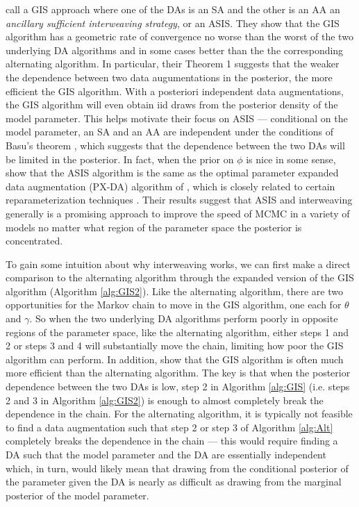 \documentclass{article}
\begin{document}
 call a GIS approach where one of the DAs is an SA and the other is an AA an {\it ancillary sufficient interweaving strategy}, or an ASIS. They show that the GIS algorithm has a geometric rate of convergence no worse than the worst of the two underlying DA algorithms and in some cases better than the the corresponding alternating algorithm. In particular, their Theorem 1 suggests that the weaker the dependence between two data augumentations in the posterior, the more efficient the GIS algorithm. With a posteriori independent data augmentations, the GIS algorithm will even obtain iid draws from the posterior density of the model parameter. This helps motivate their focus on ASIS --- conditional on the model parameter, an SA and an AA are independent under the conditions of Basu's theorem \cite{basu1955statistics}, which suggests that the dependence between the two DAs will be limited in the posterior. In fact, when the prior on $\phi$ is nice in some sense,  show that the ASIS algorithm is the same as the optimal parameter expanded data augmentation (PX-DA) algorithm of , which is closely related to certain reparameterization techniques  \cite{hobert2008theoretical}. Their results suggest that ASIS and interweaving generally is a promising approach to improve the speed of MCMC in a variety of models no matter what region of the parameter space the posterior is concentrated. 

To gain some intuition about why interweaving works, we can first make a direct comparison to the alternating algorithm through the expanded version of the GIS algorithm (Algorithm \ref{alg:GIS2}). Like the alternating algorithm, there are two opportunities for the Markov chain to move in the GIS algorithm, one each for $\theta$ and $\gamma$. So when the two underlying DA algorithms perform poorly in opposite regions of the parameter space, like the alternating algorithm, either steps 1 and 2 or steps 3 and 4 will substantially move the chain, limiting how poor the GIS algorithm can perform. In addition,  show that the GIS algorithm is often much more efficient than the alternating algorithm. The key is that when the posterior dependence between the two DAs is low, step 2 in Algorithm \ref{alg:GIS} (i.e. steps 2 and 3 in Algorithm \ref{alg:GIS2}) is enough to almost completely break the dependence in the chain. For the alternating algorithm, it is typically not feasible to find a data augmentation such that step 2 or step 3 of Algorithm \ref{alg:Alt} completely breaks the dependence in the chain --- this would require finding a DA such that the model parameter and the DA are essentially independent which, in turn, would likely mean that drawing from the conditional posterior of the parameter given the DA is nearly as difficult as drawing from the marginal posterior of the model parameter.
\end{document}
